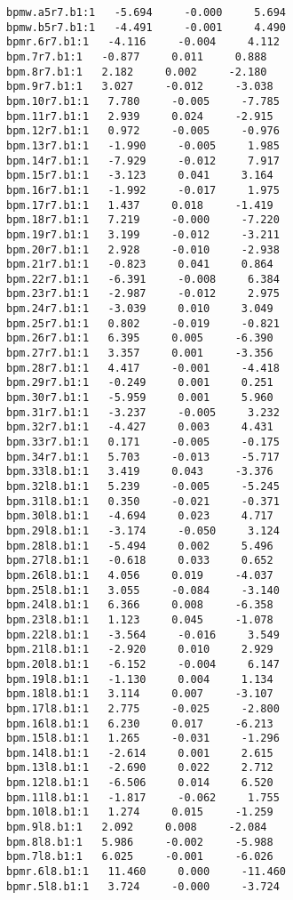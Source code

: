 \begin{verbatim}
bpmw.a5r7.b1:1   -5.694     -0.000     5.694
bpmw.b5r7.b1:1   -4.491     -0.001     4.490
bpmr.6r7.b1:1   -4.116     -0.004     4.112
bpm.7r7.b1:1   -0.877     0.011     0.888
bpm.8r7.b1:1   2.182     0.002     -2.180
bpm.9r7.b1:1   3.027     -0.012     -3.038
bpm.10r7.b1:1   7.780     -0.005     -7.785
bpm.11r7.b1:1   2.939     0.024     -2.915
bpm.12r7.b1:1   0.972     -0.005     -0.976
bpm.13r7.b1:1   -1.990     -0.005     1.985
bpm.14r7.b1:1   -7.929     -0.012     7.917
bpm.15r7.b1:1   -3.123     0.041     3.164
bpm.16r7.b1:1   -1.992     -0.017     1.975
bpm.17r7.b1:1   1.437     0.018     -1.419
bpm.18r7.b1:1   7.219     -0.000     -7.220
bpm.19r7.b1:1   3.199     -0.012     -3.211
bpm.20r7.b1:1   2.928     -0.010     -2.938
bpm.21r7.b1:1   -0.823     0.041     0.864
bpm.22r7.b1:1   -6.391     -0.008     6.384
bpm.23r7.b1:1   -2.987     -0.012     2.975
bpm.24r7.b1:1   -3.039     0.010     3.049
bpm.25r7.b1:1   0.802     -0.019     -0.821
bpm.26r7.b1:1   6.395     0.005     -6.390
bpm.27r7.b1:1   3.357     0.001     -3.356
bpm.28r7.b1:1   4.417     -0.001     -4.418
bpm.29r7.b1:1   -0.249     0.001     0.251
bpm.30r7.b1:1   -5.959     0.001     5.960
bpm.31r7.b1:1   -3.237     -0.005     3.232
bpm.32r7.b1:1   -4.427     0.003     4.431
bpm.33r7.b1:1   0.171     -0.005     -0.175
bpm.34r7.b1:1   5.703     -0.013     -5.717
bpm.33l8.b1:1   3.419     0.043     -3.376
bpm.32l8.b1:1   5.239     -0.005     -5.245
bpm.31l8.b1:1   0.350     -0.021     -0.371
bpm.30l8.b1:1   -4.694     0.023     4.717
bpm.29l8.b1:1   -3.174     -0.050     3.124
bpm.28l8.b1:1   -5.494     0.002     5.496
bpm.27l8.b1:1   -0.618     0.033     0.652
bpm.26l8.b1:1   4.056     0.019     -4.037
bpm.25l8.b1:1   3.055     -0.084     -3.140
bpm.24l8.b1:1   6.366     0.008     -6.358
bpm.23l8.b1:1   1.123     0.045     -1.078
bpm.22l8.b1:1   -3.564     -0.016     3.549
bpm.21l8.b1:1   -2.920     0.010     2.929
bpm.20l8.b1:1   -6.152     -0.004     6.147
bpm.19l8.b1:1   -1.130     0.004     1.134
bpm.18l8.b1:1   3.114     0.007     -3.107
bpm.17l8.b1:1   2.775     -0.025     -2.800
bpm.16l8.b1:1   6.230     0.017     -6.213
bpm.15l8.b1:1   1.265     -0.031     -1.296
bpm.14l8.b1:1   -2.614     0.001     2.615
bpm.13l8.b1:1   -2.690     0.022     2.712
bpm.12l8.b1:1   -6.506     0.014     6.520
bpm.11l8.b1:1   -1.817     -0.062     1.755
bpm.10l8.b1:1   1.274     0.015     -1.259
bpm.9l8.b1:1   2.092     0.008     -2.084
bpm.8l8.b1:1   5.986     -0.002     -5.988
bpm.7l8.b1:1   6.025     -0.001     -6.026
bpmr.6l8.b1:1   11.460     0.000     -11.460
bpmr.5l8.b1:1   3.724     -0.000     -3.724

\end{verbatim}
